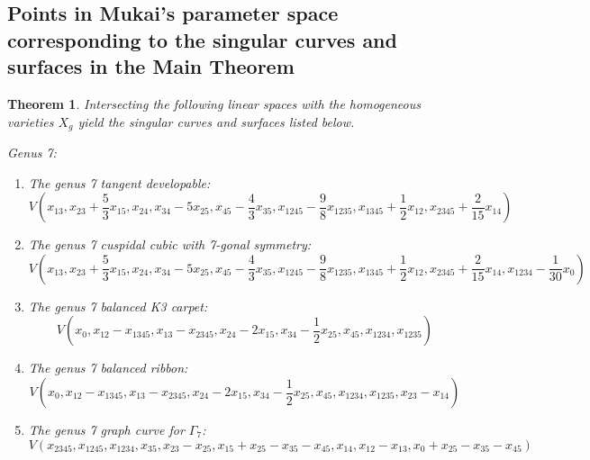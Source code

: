 \documentclass{amsart}[12pt]
\newtheorem{theorem}{Theorem}[section]
\theoremstyle{definition}
\numberwithin{equation}{section}
\begin{document}
\subsection{Points in Mukai's parameter space corresponding to the singular curves and surfaces in the Main Theorem}\label{subsec:points}
\begin{theorem} \label{thm: points in parameter space}
  Intersecting the following linear spaces with the homogeneous varieties $X_g$ yield the singular curves and surfaces listed below.

Genus 7:
  \begin{enumerate}
  \item[(a)] The genus 7 tangent developable:
    \[ V(x_{13}, x_{23}+\frac{5}{3} x_{15}, x_{24}, x_{34}-5 x_{25}, x_{45}-\frac{4}{3} x_{35}, x_{1245}-\frac{9}{8} x_{1235}, x_{1345}+\frac{1}{2} x_{12}, x_{2345}+\frac{2}{15} x_{14})
     \]
\item[(b)] The genus 7 cuspidal cubic with 7-gonal symmetry:
    \[ V(x_{13}, x_{23}+\frac{5}{3} x_{15}, x_{24}, x_{34}-5 x_{25},
      x_{45}-\frac{4}{3} x_{35}, x_{1245}-\frac{9}{8} x_{1235},
      x_{1345}+\frac{1}{2} x_{12}, x_{2345}+\frac{2}{15}
      x_{14},x_{1234}-\frac{1}{30} x_0)
     \]
   \item[(c)] The genus 7 balanced K3 carpet:
  \[
V(x_0, x_{12} - x_{1345}, x_{13} - x_{2345}, x_{24} - 2 x_{15}, x_{34} - \frac{1}{2}x_{25}, x_{45}, x_{1234}, x_{1235})
   \]
 \item[(d)] The genus 7 balanced ribbon:
   \[
     V(x_0, x_{12}-x_{1345}, x_{13}-x_{2345}, x_{24}-2 x_{15},
     x_{34} - \frac{1}{2}x_{25}, x_{45}, x_{1234}, x_{1235}, x_{23}-x_{14} )
   \]
 \item[(e)] The genus 7 graph curve for $\Gamma_7$:
   \[ V(x_{2345},x_{1245},x_{1234},x_{35},x_{23}-x_{25},x_{15}+x_{25}-x_{35}-x_{45},x_{14},x_{12}-x_{13},x_0+x_{25}-x_{35}-x_{45})
    \]
\end{enumerate}


\end{theorem}
\end{document}
